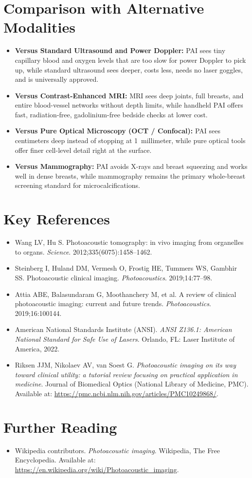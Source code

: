 \section{Comparison with Alternative Modalities}
\begin{itemize}
  \item \textbf{Versus Standard Ultrasound and Power Doppler:} PAI sees tiny capillary blood and oxygen levels that are too slow for power Doppler to pick up, while standard ultrasound sees deeper, costs less, needs no laser goggles, and is universally approved.
  \item \textbf{Versus Contrast-Enhanced MRI:} MRI sees deep joints, full breasts, and entire blood-vessel networks without depth limits, while handheld PAI offers fast, radiation-free, gadolinium-free bedside checks at lower cost.
  \item \textbf{Versus Pure Optical Microscopy (OCT / Confocal):} PAI sees centimeters deep instead of stopping at 1~millimeter, while pure optical tools offer finer cell-level detail right at the surface.
  \item \textbf{Versus Mammography:} PAI avoids X-rays and breast squeezing and works well in dense breasts, while mammography remains the primary whole-breast screening standard for microcalcifications.
\end{itemize}

\section{Key References}
\begin{itemize}
  \item Wang LV, Hu S. Photoacoustic tomography: in vivo imaging from organelles to organs. \textit{Science}. 2012;335(6075):1458--1462.
  \item Steinberg I, Huland DM, Vermesh O, Frostig HE, Tummers WS, Gambhir SS. Photoacoustic clinical imaging. \textit{Photoacoustics}. 2019;14:77--98.
  \item Attia ABE, Balasundaram G, Moothanchery M, et al. A review of clinical photoacoustic imaging: current and future trends. \textit{Photoacoustics}. 2019;16:100144.
  \item American National Standards Institute (ANSI). \textit{ANSI Z136.1: American National Standard for Safe Use of Lasers}. Orlando, FL: Laser Institute of America, 2022.
  \item Riksen JJM, Nikolaev AV, van Soest G. \textit{Photoacoustic imaging on its way toward clinical utility: a tutorial review focusing on practical application in medicine}. Journal of Biomedical Optics (National Library of Medicine, PMC). Available at: \url{https://pmc.ncbi.nlm.nih.gov/articles/PMC10249868/}.
\end{itemize}

\section{Further Reading}
\begin{itemize}
  \item Wikipedia contributors. \textit{Photoacoustic imaging}. Wikipedia, The Free Encyclopedia. Available at: \url{https://en.wikipedia.org/wiki/Photoacoustic_imaging}.
\end{itemize}
